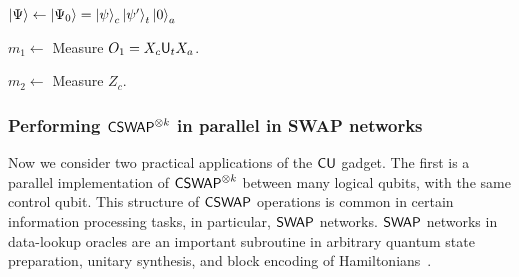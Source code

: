 \documentclass[11pt]{article}
\begin{document}
\begin{algorithm}
    \caption{Implementing $\CT$}
    \label{alg:cu-gadget}

    \vspace{0.5cm}

     $\ket{\Psi} \leftarrow \ket{\Psi_0} = \ket{\psi}_c \ket{\psi'}_t \ket{0}_a$ \quad \quad \quad {}

    $m_1 \leftarrow$ Measure $O_1 = X_c \mathsf{U}_t X_a$.
    


    $m_2 \leftarrow$ Measure $Z_c$.



\end{algorithm}

\subsubsection{Performing $\mathsf{CSWAP}^{\otimes k}$ in parallel in SWAP networks}
\label{sec:applications-with-cswap}

Now we consider two practical applications of the $\CT$ gadget. The first is a parallel implementation of $\mathsf{CSWAP}^{\otimes k}$ between many logical qubits, with the same control qubit. This structure of $\mathsf{CSWAP}$ operations is common in certain information processing tasks, in particular, $\mathsf{SWAP}$ networks.
$\mathsf{SWAP}$ networks in data-lookup oracles are an important subroutine in arbitrary quantum state preparation, unitary synthesis, and block encoding of Hamiltonians~\cite{Low_2024,liu2025blockencodinglowgate}.
\end{document}

